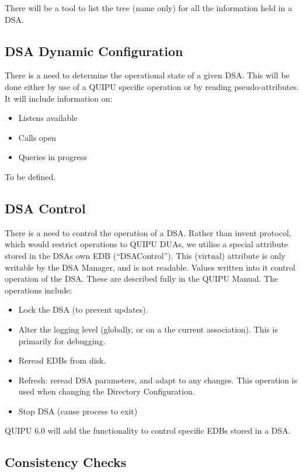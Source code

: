 There will be a tool to list the tree (name only) for all the information
held in a DSA.   

\subsection {DSA Dynamic Configuration}

There is a need to determine the operational state of a given DSA.  This
will be done either by use of a QUIPU specific operation or by reading
pseudo-attributes.  It will include information on:

\begin {itemize}
\item  Listens available
\item  Calls open
\item  Queries in progress
\end {itemize}

To be defined.  

\subsection {DSA Control}
\label {dsa-control}

There is a need to control the operation of a DSA.  Rather than invent
protocol, which would restrict operations to QUIPU DUAs, we utilise a special
attribute stored in the DSAs own EDB (``DSAControl'').  This (virtual) attribute is only
writable by the DSA Manager, and is not readable.   Values written into it
control operation of the DSA.  These are described fully in the QUIPU Manual.
The operations include:

\begin {itemize}
\item Lock the DSA (to prevent updates).
\item Alter the logging level (globally, or on a the current association).
This is primarily for debugging.
\item Reread EDBs from disk.
\item Refresh: reread DSA parameters, and adapt to any changes.  This operation is
used when changing the Directory Configuration.
\item Stop DSA (cause process to exit)
\end {itemize}


QUIPU 6.0 will add the functionality to control specific EDBs stored in a
DSA.


\subsection {Consistency Checks}


